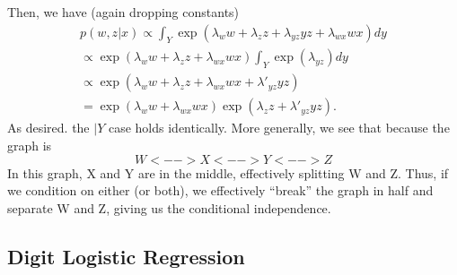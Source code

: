 \documentclass[
]{article}
\begin{document}
Then, we have (again dropping constants) \begin{align*}
p(w, z |x)
\propto
\int_Y
\exp\left(\lambda_ww + \lambda_zz+ \lambda_{yz}yz + \lambda_{wx}wx
\right)dy \\
\propto
\exp\left(\lambda_ww + \lambda_zz+ \lambda_{wx}wx
\right)
\int_Y\exp(\lambda_{yz})dy \\
\propto
\exp\left(\lambda_ww + \lambda_zz+ \lambda_{wx}wx + \lambda'_{yz}yz
\right) \\
=
\exp\left(\lambda_ww + \lambda_{wx}wx 
\right)\exp\left( \lambda_zz + \lambda'_{yz}yz
\right).
\end{align*} As desired. the \(|Y\) case holds identically. More
generally, we see that because the graph is \[
W <--> X <--> Y <--> Z
\] In this graph, X and Y are in the middle, effectively splitting W and
Z. Thus, if we condition on either (or both), we effectively ``break''
the graph in half and separate W and Z, giving us the conditional
independence.

\hypertarget{digit-logistic-regression}{%
\subsection{Digit Logistic Regression}\label{digit-logistic-regression}}
\end{document}
